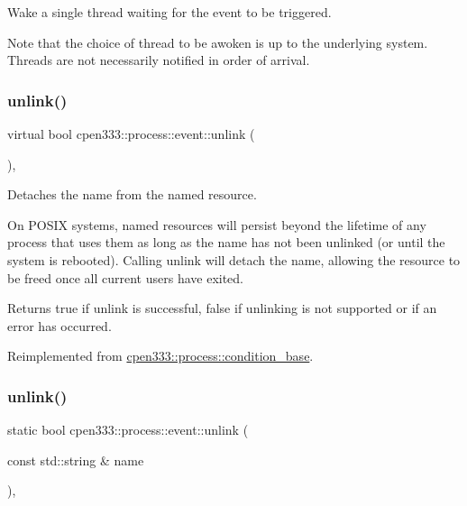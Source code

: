 Wake a single thread waiting for the event to be triggered. 

Note that the choice of thread to be awoken is up to the underlying system. Threads are not necessarily notified in order of arrival. \mbox{\label{classcpen333_1_1process_1_1event_a37a2d53cbf4a90da6b4dbd5853f23b32}} 
\subsubsection{\texorpdfstring{unlink()}{unlink()}\hspace{0.1cm}{\footnotesize\ttfamily [1/2]}}
{\footnotesize\ttfamily virtual bool cpen333\+::process\+::event\+::unlink (\begin{DoxyParamCaption}{ }\end{DoxyParamCaption})\hspace{0.3cm}{\ttfamily [inline]}, {\ttfamily [virtual]}}



Detaches the name from the named resource. 

On P\+O\+S\+IX systems, named resources will persist beyond the lifetime of any process that uses them as long as the name has not been unlinked (or until the system is rebooted). Calling {\ttfamily unlink} will detach the name, allowing the resource to be freed once all current users have exited.

\begin{DoxyReturn}{Returns}
{\ttfamily true} if unlink is successful, {\ttfamily false} if unlinking is not supported or if an error has occurred. 
\end{DoxyReturn}


Reimplemented from \hyperlink{classcpen333_1_1process_1_1condition__base_acd6d0b53a828aa161ccad06885eaa15c}{cpen333\+::process\+::condition\+\_\+base}.

\mbox{\label{classcpen333_1_1process_1_1event_a5e013471e78e37c47036bd408987662a}} 
\subsubsection{\texorpdfstring{unlink()}{unlink()}\hspace{0.1cm}{\footnotesize\ttfamily [2/2]}}
{\footnotesize\ttfamily static bool cpen333\+::process\+::event\+::unlink (\begin{DoxyParamCaption}\item[{const std\+::string \&}]{name }\end{DoxyParamCaption})\hspace{0.3cm}{\ttfamily [inline]}, {\ttfamily [static]}}



